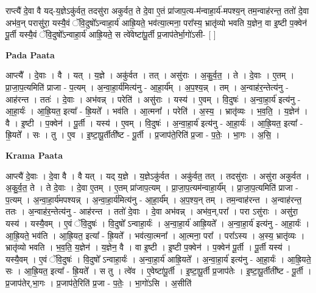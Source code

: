 \documentclass[17pt]{extarticle}
\begin{document}
राप्त्यै॑ दे॒वा वै यद्-य॒ज्ञेऽकु॑र्वत॒ तदसु॑रा अकुर्वत॒ ते दे॒वा ए॒तं प्रा॑जाप॒त्य-म॑न्वाहा॒र्य॑-मपश्य॒न् तम॒न्वाह॑रन्त॒ ततो॑ दे॒वा अभ॑व॒न् परासु॑रा॒ यस्यै॒वं ॅवि॒दुषो᳚ऽन्वाहा॒र्य॑ आह्रि॒यते॒ भव॑त्या॒त्मना॒ परा᳚स्य॒ भ्रातृ॑व्यो भवति य॒ज्ञेन॒ वा इ॒ष्टी प॒क्वेन॑ पू॒र्ती यस्यै॒वं ॅवि॒दुषो᳚ऽन्वाहा॒र्य॑ आह्रि॒यते॒ स त्वे॑वेष्टा॑पू॒र्ती प्र॒जाप॑तेर्भा॒गो॑ऽसी- [ ] \newline

\textbf{Pada Paata} \newline

आप्त्यै᳚ । दे॒वाः । वै । यत् । य॒ज्ञे । अकु॑र्वत । तत् । असु॑राः । अ॒कु॒र्व॒त॒ । ते । दे॒वाः । ए॒तम् । प्रा॒जा॒प॒त्यमिति॑ प्राजा - प॒त्यम् । अ॒न्वा॒हा॒र्य॑मित्य॑नु - आ॒हा॒र्य᳚म् । अ॒प॒श्य॒न्न् । तम् । अ॒न्वाह॑र॒न्तेत्य॑नु - आह॑रन्त । ततः॑ । दे॒वाः । अभ॑वन्न् । परेति॑ । असु॑राः । यस्य॑ । ए॒वम् । वि॒दुषः॑ । अ॒न्वा॒हा॒र्य॑ इत्य॑नु - आ॒हा॒र्यः॑ । आ॒ह्रि॒यत॒ इत्या᳚ - ह्रि॒यते᳚ । भव॑ति । आ॒त्मना᳚ । परेति॑ । अ॒स्य॒ । भ्रातृ॑व्यः । भ॒व॒ति॒ । य॒ज्ञेन॑ । वै । इ॒ष्टी । प॒क्वेन॑ । पू॒र्ती । यस्य॑ । ए॒वम् । वि॒दुषः॑ । अ॒न्वा॒हा॒र्य॑ इत्य॑नु - आ॒हा॒र्यः॑ । आ॒ह्रि॒यत॒ इत्या᳚ - ह्रि॒यते᳚ । सः । तु । ए॒व । इ॒ष्टा॒पू॒र्तीती᳚ष्ट - पू॒र्ती । प्र॒जाप॑ते॒रिति॑ प्र॒जा - प॒तेः॒ । भा॒गः । अ॒सि॒ ।  \newline


\textbf{Krama Paata} \newline

आप्त्यै॑ दे॒वाः । दे॒वा वै । वै यत् । यद् य॒ज्ञे । य॒ज्ञेऽकु॑र्वत । अकु॑र्वत॒ तत् । तदसु॑राः । असु॑रा अकुर्वत । अ॒कु॒र्व॒त॒ ते । ते दे॒वाः । दे॒वा ए॒तम् । ए॒तम् प्रा॑जाप॒त्यम् । प्रा॒जा॒प॒त्यम॑न्वाहा॒र्य᳚म् । प्रा॒जा॒प॒त्यमिति॑ प्राजा - प॒त्यम् । अ॒न्वा॒हा॒र्य॑मपश्यन्न् । अ॒न्वा॒हा॒र्य॑मित्य॑नु - आ॒हा॒र्य᳚म् । अ॒प॒श्य॒न् तम् । तम॒न्वाह॑रन्त । अ॒न्वाह॑रन्त॒ ततः । अ॒न्वाह॑र॒न्तेत्य॑नु - आह॑रन्त । ततो॑ दे॒वाः । दे॒वा अभ॑वन्न् । अभ॑व॒न्,परा᳚ । परा ऽसु॑राः । असु॑रा॒ यस्य॑ । यस्यै॒वम् । ए॒वं ॅवि॒दुषः॑ । वि॒दुषो᳚ ऽन्वाहा॒र्यः॑ । अ॒न्वा॒हा॒र्य॑ आह्रि॒यते᳚ । अ॒न्वा॒हा॒र्य॑ इत्य॑नु - आ॒हा॒र्यः॑ । आ॒ह्रि॒यते॒ भव॑ति । आ॒ह्रि॒यत॒ इत्या᳚ - ह्रि॒यते᳚ । भव॑त्या॒त्मना᳚ । आ॒त्मना॒ परा᳚ । परा᳚ऽस्य । अ॒स्य॒ भ्रातृ॑व्यः । भ्रातृ॑व्यो भवति । भ॒व॒ति॒ य॒ज्ञेन॑ । य॒ज्ञेन॒ वै । वा इ॒ष्टी । इ॒ष्टी प॒क्वेन॑ । प॒क्वेन॑ पू॒र्ती । पू॒र्ती यस्य॑ । यस्यै॒वम् । ए॒वं ॅवि॒दुषः॑ । वि॒दुषो᳚ ऽन्वाहा॒र्यः॑ । अ॒न्वा॒हा॒र्य॑ आह्रि॒यते᳚ । अ॒न्वा॒हा॒र्य॑ इत्य॑नु - आ॒हा॒र्यः॑ । आ॒ह्रि॒यते॒ सः । आ॒ह्रि॒यत॒ इत्या᳚ - ह्रि॒यते᳚ । स तु । त्वे॑व । ए॒वेष्टा॑पू॒र्ती । इ॒ष्टा॒पू॒र्ती प्र॒जाप॑तेः । इ॒ष्टा॒पू॒र्तीती᳚ष्ट - पू॒र्ती । प्र॒जाप॑तेर्,भा॒गः । प्र॒जाप॑ते॒रिति॑ प्र॒जा - प॒तेः॒ । भा॒गो॑ऽसि । अ॒सीति॑ \newline
\end{document}
